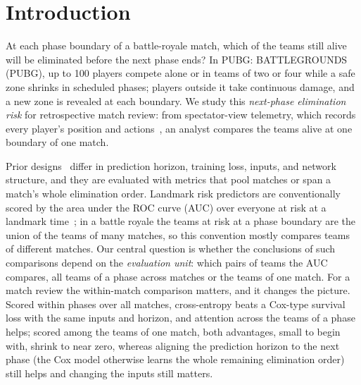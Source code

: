 \documentclass[sigconf,anonymous]{acmart}
\begin{document}
\section{Introduction}
\label{sec:introduction}
At each phase boundary of a battle-royale match, which of the teams still alive will be eliminated before the next phase ends? In PUBG: BATTLEGROUNDS (PUBG), up to 100 players compete alone or in teams of two or four while a safe zone shrinks in scheduled phases; players outside it take continuous damage, and a new zone is revealed at each boundary. We study this \emph{next-phase elimination risk} for retrospective match review: from spectator-view telemetry, which records every player's position and actions~\cite{PUBGAPI}, an analyst compares the teams alive at one boundary of one match.

Prior designs~\cite{Sagong25a,KRAFTON} differ in prediction horizon, training loss, inputs, and network structure, and they are evaluated with metrics that pool matches or span a match's whole elimination order. Landmark risk predictors are conventionally scored by the area under the ROC curve (AUC) over everyone at risk at a landmark time~\cite{vanHouwelingen07,HeagertyZheng05}; in a battle royale the teams at risk at a phase boundary are the union of the teams of many matches, so this convention mostly compares teams of different matches. Our central question is whether the conclusions of such comparisons depend on the \emph{evaluation unit}: which pairs of teams the AUC compares, all teams of a phase across matches or the teams of one match. For a match review the within-match comparison matters, and it changes the picture. Scored within phases over all matches, cross-entropy beats a Cox-type survival loss with the same inputs and horizon, and attention across the teams of a phase helps; scored among the teams of one match, both advantages, small to begin with, shrink to near zero, whereas aligning the prediction horizon to the next phase (the Cox model otherwise learns the whole remaining elimination order) still helps and changing the inputs still matters.
\end{document}
